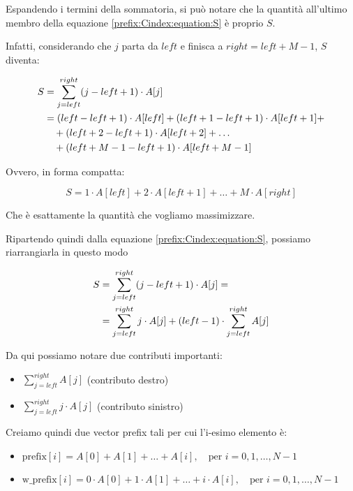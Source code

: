 Espandendo i termini della sommatoria, si può notare che la quantità all'ultimo membro della equazione \ref{prefix:Cindex:equation:S} è proprio $S$.

Infatti, considerando che $j$ parta da $left$ e finisca a $right = left+M-1$, $S$ diventa:


\begin{align}
	S &= \sum_{j = left}^{right} (j - left + 1) \cdot A[j] \\
	&= (left - left + 1) \cdot A[left] 
	+ (left + 1 - left + 1) \cdot A[left+1] + \notag \\
	&\quad + (left + 2 - left + 1) \cdot A[left+2] 
	+ \dots \notag \\
	&\quad + (left + M - 1 - left + 1) \cdot A[left + M - 1] \notag
\end{align}

Ovvero, in forma compatta:

\begin{equation}
	S = 1 \cdot A[left] + 2 \cdot A[left+1] + \dots + M \cdot A[right]
\end{equation}

Che è esattamente la quantità che vogliamo massimizzare.

\vspace{0.5cm}

Ripartendo quindi dalla equazione \ref{prefix:Cindex:equation:S}, possiamo riarrangiarla in questo modo

\begin{align}
	S &= \sum_{j = left}^{right} (j - left + 1) \cdot A[j] = \notag \\
	&= \sum_{j = left}^{right} j \cdot A[j] + (left - 1) \cdot \sum_{j = left}^{right} A[j]
\end{align}

Da qui possiamo notare due contributi importanti:
\begin{itemize}
	\item $\sum_{j = left}^{right} A[j]$ (contributo destro)
	\item $\sum_{j = left}^{right} j \cdot A[j]$ (contributo sinistro)
\end{itemize}

Creiamo quindi due vector prefix tali per cui l'i-esimo elemento è:
\begin{itemize}
	\item \(\text{prefix}[i] = A[0] + A[1] + \dots + A[i], \quad \text{per } i = 0, 1, \dots, N-1\)
	
	\item \(\text{w\_prefix}[i] = 0 \cdot A[0] + 1 \cdot A[1] + \dots + i \cdot A[i], \quad \text{per } i = 0, 1, \dots, N-1\)
\end{itemize}


